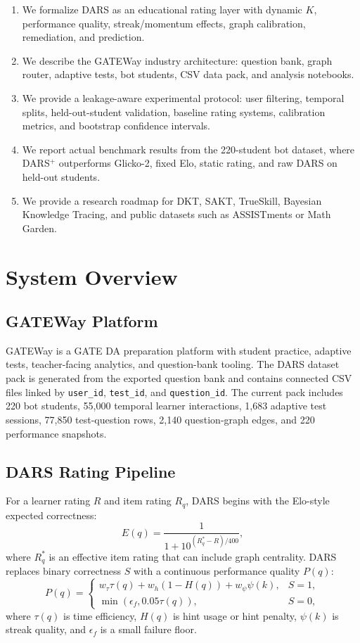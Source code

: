 \documentclass[sigconf,nonacm]{acmart}
\begin{document}
\begin{enumerate}[leftmargin=*]
  \item We formalize DARS as an educational rating layer with dynamic $K$, performance quality, streak/momentum effects, graph calibration, remediation, and prediction.
  \item We describe the GATEWay industry architecture: question bank, graph router, adaptive tests, bot students, CSV data pack, and analysis notebooks.
  \item We provide a leakage-aware experimental protocol: user filtering, temporal splits, held-out-student validation, baseline rating systems, calibration metrics, and bootstrap confidence intervals.
  \item We report actual benchmark results from the 220-student bot dataset, where DARS$^+$ outperforms Glicko-2, fixed Elo, static rating, and raw DARS on held-out students.
  \item We provide a research roadmap for DKT, SAKT, TrueSkill, Bayesian Knowledge Tracing, and public datasets such as ASSISTments or Math Garden.
\end{enumerate}

\section{System Overview}
\subsection{GATEWay Platform}
GATEWay is a GATE DA preparation platform with student practice, adaptive tests, teacher-facing analytics, and question-bank tooling. The DARS dataset pack is generated from the exported question bank and contains connected CSV files linked by \texttt{user\_id}, \texttt{test\_id}, and \texttt{question\_id}. The current pack includes 220 bot students, 55,000 temporal learner interactions, 1,683 adaptive test sessions, 77,850 test-question rows, 2,140 question-graph edges, and 220 performance snapshots.

\subsection{DARS Rating Pipeline}
For a learner rating $R$ and item rating $R_q$, DARS begins with the Elo-style expected correctness:
\begin{equation}
E(q)=\frac{1}{1+10^{(R_q^\ast-R)/400}},
\end{equation}
where $R_q^\ast$ is an effective item rating that can include graph centrality. DARS replaces binary correctness $S$ with a continuous performance quality $P(q)$:
\begin{equation}
P(q)=
\begin{cases}
w_\tau\tau(q)+w_h(1-H(q))+w_\psi\psi(k), & S=1,\\
\min(\epsilon_f, 0.05\tau(q)), & S=0,
\end{cases}
\end{equation}
where $\tau(q)$ is time efficiency, $H(q)$ is hint usage or hint penalty, $\psi(k)$ is streak quality, and $\epsilon_f$ is a small failure floor.
\end{document}
